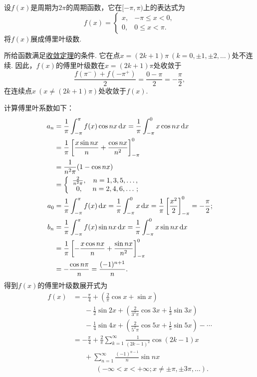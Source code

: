 \begin{example}
设\(f(x)\)是周期为\(2\pi\)的周期函数，它在\([-\pi,\pi)\)上的表达式为\[
f(x) = \left\{ \begin{array}{cc}
x, & -\pi \leqslant x < 0, \\
0, & 0 \leqslant x < \pi.
\end{array} \right.
\]
将\(f(x)\)展成傅里叶级数.
\begin{solution}
所给函数满足\hyperref[theorem:无穷级数.傅里叶级数收敛的狄利克雷充分条件]{收敛定理}的条件.
它在点\(x=(2k+1)\pi\ (k=0,\pm1,\pm2,\dotsc)\)处不连续.
因此，\(f(x)\)的傅里叶级数在\(x=(2k+1)\pi\)处收敛于\[
\frac{f(\pi^-)+f(-\pi^+)}{2} = \frac{0-\pi}{2} = -\frac{\pi}{2},
\]在连续点\(x\ (x\neq(2k+1)\pi)\)处收敛于\(f(x)\).

计算傅里叶系数如下：\begin{align*}
a_n &= \frac{1}{\pi} \int_{-\pi}^{\pi} f(x) \cos nx \dd{x}
= \frac{1}{\pi} \int_{-\pi}^0 x \cos nx \dd{x} \\
&= \frac{1}{\pi} \left[ \frac{x \sin nx}{n} + \frac{\cos nx}{n^2} \right]_{-\pi}^0 \\
&= \frac{1}{n^2 \pi} (1-\cos nx) \\
&= \left\{ \begin{array}{cc}
\frac{2}{n^2 \pi}, & n=1,3,5,\dotsc, \\
0, & n=2,4,6,\dotsc;
\end{array} \right. \\
a_0 &= \frac{1}{\pi} \int_{-\pi}^{\pi} f(x) \dd{x}
= \frac{1}{\pi} \int_{-\pi}^0 x \dd{x}
= \frac{1}{\pi} \left[ \frac{x^2}{2} \right]_{-\pi}^0 = -\frac{\pi}{2}; \\
b_n &= \frac{1}{\pi} \int_{-\pi}^{\pi} f(x) \sin nx \dd{x}
= \frac{1}{\pi} \int_{-\pi}^0 x \sin nx \dd{x} \\
&= \frac{1}{\pi} \left[ -\frac{x \cos nx}{n} + \frac{\sin nx}{n^2} \right]_{-\pi}^0 \\
&= -\frac{\cos n\pi}{n} = \frac{(-1)^{n+1}}{n}.
\end{align*}
得到\(f(x)\)的傅里叶级数展开式为\begin{align*}
f(x) &= -\frac{\pi}{4} + \left(\frac{2}{\pi} \cos x + \sin x\right) \\
&\hspace{20pt}-\frac{1}{2}\sin 2x + \left(\frac{2}{3^2\pi}\cos 3x + \frac{1}{3}\sin 3x\right) \\
&\hspace{20pt}-\frac{1}{4}\sin 4x + \left(\frac{2}{5^2\pi}\cos 5x + \frac{1}{5}\sin 5x\right)
-\dotsb \\
&= -\frac{\pi}{4} + \frac{2}{\pi} \sum\limits_{k=1}^\infty \frac{1}{(2k-1)^2} \cos(2k-1)x \\
&\hspace{20pt}+\sum\limits_{n=1}^\infty \frac{(-1)^{n-1}}{n} \sin nx \\
&\hspace{40pt}(-\infty<x<+\infty; x\neq\pm\pi,\pm3\pi,\dotsc).
\end{align*}
\end{solution}
\end{example}

